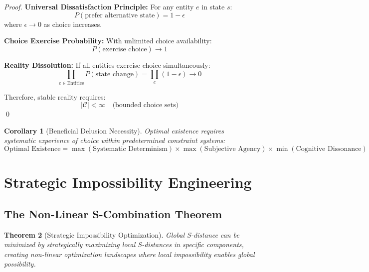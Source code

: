 \documentclass[12pt,a4paper]{article}
\newtheorem{theorem}{Theorem}[section]
\newtheorem{corollary}[theorem]{Corollary}
\begin{document}
\begin{proof}
\textbf{Universal Dissatisfaction Principle:}
For any entity $e$ in state $s$:
\begin{equation}
P(\text{prefer alternative state}) = 1 - \epsilon
\end{equation}
where $\epsilon \to 0$ as choice increases.

\textbf{Choice Exercise Probability:}
With unlimited choice availability:
\begin{equation}
P(\text{exercise choice}) \to 1
\end{equation}

\textbf{Reality Dissolution:}
If all entities exercise choice simultaneously:
\begin{equation}
\prod_{e \in \text{Entities}} P(\text{state change}) = \prod_{e} (1-\epsilon) \to 0
\end{equation}

Therefore, stable reality requires:
\begin{equation}
|\mathcal{C}| < \infty \quad \text{(bounded choice sets)}
\end{equation}
\qed
\end{proof}

\begin{corollary}[Beneficial Delusion Necessity]
Optimal existence requires systematic experience of choice within predetermined constraint systems:
\begin{equation}
\text{Optimal Existence} = \max(\text{Systematic Determinism}) \times \max(\text{Subjective Agency}) \times \min(\text{Cognitive Dissonance})
\end{equation}
\end{corollary}

\section{Strategic Impossibility Engineering}

\subsection{The Non-Linear S-Combination Theorem}

\begin{theorem}[Strategic Impossibility Optimization]
Global S-distance can be minimized by strategically maximizing local S-distances in specific components, creating non-linear optimization landscapes where local impossibility enables global possibility.
\end{theorem}
\end{document}
